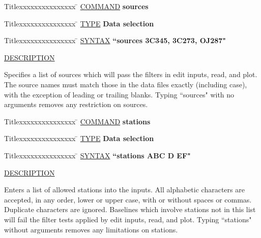 \begin{tabbing}
Titlexxxxxxxxxxxxxxx \= \kill
\underline{COMMAND} \> {\bf 	sources} \\
\end{tabbing}

\begin{tabbing}
Titlexxxxxxxxxxxxxxx \= \kill
\underline{TYPE} \> {\bf 		Data selection} \\
\end{tabbing}

\begin{tabbing}
Titlexxxxxxxxxxxxxxx \= \kill
\underline{SYNTAX} \> {\bf 		``sources 3C345, 3C273, OJ287"} \\
\end{tabbing}

\underline{DESCRIPTION}
\begin{list}{}{\setlength{\leftmargin}{0.5in}
     \setlength{\rightmargin}{0in}}
\item
Specifies a list of sources which will pass the filters in
edit inputs, read, and plot.  The source names must match
those in the data files exactly (including case), with the
exception of leading or trailing blanks.  Typing ``sources"
with no arguments removes any restriction on sources.
\end{list}
\vspace{.2in}

\begin{tabbing}
Titlexxxxxxxxxxxxxxx \= \kill
\underline{COMMAND} \> {\bf 	stations} \\
\end{tabbing}

\begin{tabbing}
Titlexxxxxxxxxxxxxxx \= \kill
\underline{TYPE} \> {\bf 		Data selection} \\
\end{tabbing}

\begin{tabbing}
Titlexxxxxxxxxxxxxxx \= \kill
\underline{SYNTAX} \> {\bf 		``stations ABC D EF"} \\
\end{tabbing}

\underline{DESCRIPTION}
\begin{list}{}{\setlength{\leftmargin}{0.5in}
     \setlength{\rightmargin}{0in}}
\item
Enters a list of allowed stations into the inputs.  All alphabetic
characters are accepted, in any order, lower or upper case, with or
without spaces or commas.  Duplicate characters are ignored.  Baselines
which involve stations not in this list will fail the filter tests
applied by edit inputs, read, and plot.  Typing ``stations" without
arguments removes any limitations on stations.
\end{list}
\vspace{.2in}

